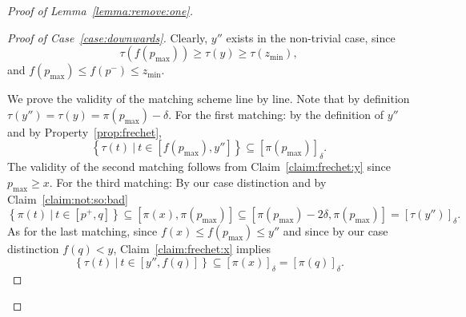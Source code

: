\documentclass[11pt, letter]{article}
\newcommand{\lemref}[1]{Lemma~\ref{lemma:#1}}
\newcommand{\caseref}[1]{Case~\ref{case:#1}}
\newcommand{\claimref}[1]{Claim~\ref{claim:#1}}
\newcommand{\propref}[1]{Property~\ref{prop:#1}}
\providecommand{\brc}[1]{\left\{ {#1} \right\}}
\newcommand{\setSubC}[4]{\ensuremath{\brc{ #1(#2) ~|~ #2 \in [#3,#4]} }}
\newcommand{\range}[2]{\ensuremath{[#1]_{#2}}}
\begin{document}
\begin{proof}[Proof of \lemref{remove:one}]
\begin{proof}[Proof of \caseref{downwards}]
Clearly, $y''$ exists in the non-trivial case, since  
\[ \tau(f(p_{\max})) \geq \tau(y) \geq \tau(z_{\min}),\]
and $f(p_{\max}) \leq f(p^{-}) \leq z_{\min}$.

We prove the validity of the matching scheme line by line.
Note that by definition $\tau(y'') = \tau(y) = \pi(p_{\max})-\delta$.
For the first matching:
by the definition of $y''$ and by \propref{frechet},
\[\setSubC{\tau}{t}{f(p_{\max})}{y''} \subseteq \range{\pi(p_{\max})}{\delta}. \]
The validity of the second matching follows from \claimref{frechet:y} since $p_{\max} \geq x$.
For the third matching:
By our case distinction and by \claimref{not:so:bad}
\[\setSubC{\pi}{t}{p^{+}}{q} 
\subseteq [\pi(x), \pi(p_{\max})]
\subseteq [\pi(p_{\max})-2\delta, \pi(p_{\max})]
=\range{\tau(y'')}{\delta}.\]
As for the last matching, since $f(x) \leq f(p_{\max}) \leq y''$ and since by our case distinction
$f(q) < y$, \claimref{frechet:x} implies
\[ \setSubC{\tau}{t}{y''}{f(q)} \subseteq  \range{\pi(x)}{\delta} = \range{\pi(q)}{\delta}.\]
\end{proof}






\end{proof}
\end{document}
